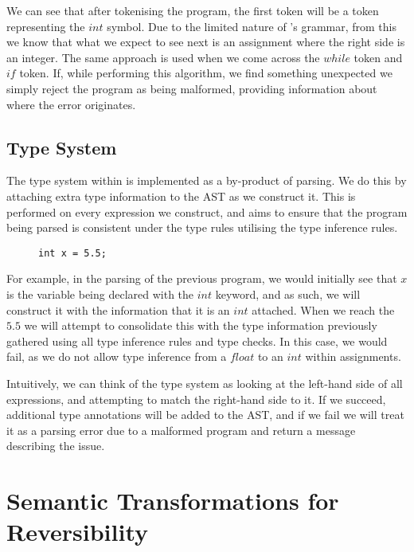 We can see that after tokenising the program, the first token will be a token representing the $int$ symbol. Due to the limited nature of \rimplang's grammar, from this we know that what we expect to see next is an assignment where the right side is an integer. The same approach is used when we come across the $while$ token and $if$ token. If, while performing this algorithm, we find something unexpected we simply reject the program as being malformed, providing information about where the error originates.

\subsection{Type System}

The type system within \rimp is implemented as a by-product of parsing. We do this by attaching extra type information to the AST as we construct it. This is performed on every expression we construct, and aims to ensure that the program being parsed is consistent under the type rules utilising the type inference rules.

\begin{figure}[h]
    \centering
    \begin{lstlisting}
int x = 5.5;
    \end{lstlisting}
    \label{fig:example_assignment}
\end{figure}

For example, in the parsing of the previous program, we would initially see that $x$ is the variable being declared with the $int$ keyword, and as such, we will construct it with the information that it is an $int$ attached. When we reach the $5.5$ we will attempt to consolidate this with the type information previously gathered using all type inference rules and type checks. In this case, we would fail, as we do not allow type inference from a $float$ to an $int$ within assignments.

Intuitively, we can think of the type system as looking at the left-hand side of all expressions, and attempting to match the right-hand side to it. If we succeed, additional type annotations will be added to the AST, and if we fail we will treat it as a parsing error due to a malformed program and return a message describing the issue.

\section{Semantic Transformations for Reversibility}

